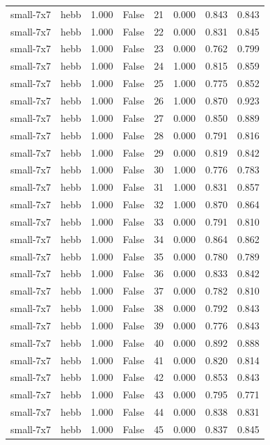 \begin{tabular}{llrrrrrr}
small-7x7 & hebb & 1.000 & False & 21 & 0.000 & 0.843 & 0.843 \\
small-7x7 & hebb & 1.000 & False & 22 & 0.000 & 0.831 & 0.845 \\
small-7x7 & hebb & 1.000 & False & 23 & 0.000 & 0.762 & 0.799 \\
small-7x7 & hebb & 1.000 & False & 24 & 1.000 & 0.815 & 0.859 \\
small-7x7 & hebb & 1.000 & False & 25 & 1.000 & 0.775 & 0.852 \\
small-7x7 & hebb & 1.000 & False & 26 & 1.000 & 0.870 & 0.923 \\
small-7x7 & hebb & 1.000 & False & 27 & 0.000 & 0.850 & 0.889 \\
small-7x7 & hebb & 1.000 & False & 28 & 0.000 & 0.791 & 0.816 \\
small-7x7 & hebb & 1.000 & False & 29 & 0.000 & 0.819 & 0.842 \\
small-7x7 & hebb & 1.000 & False & 30 & 1.000 & 0.776 & 0.783 \\
small-7x7 & hebb & 1.000 & False & 31 & 1.000 & 0.831 & 0.857 \\
small-7x7 & hebb & 1.000 & False & 32 & 1.000 & 0.870 & 0.864 \\
small-7x7 & hebb & 1.000 & False & 33 & 0.000 & 0.791 & 0.810 \\
small-7x7 & hebb & 1.000 & False & 34 & 0.000 & 0.864 & 0.862 \\
small-7x7 & hebb & 1.000 & False & 35 & 0.000 & 0.780 & 0.789 \\
small-7x7 & hebb & 1.000 & False & 36 & 0.000 & 0.833 & 0.842 \\
small-7x7 & hebb & 1.000 & False & 37 & 0.000 & 0.782 & 0.810 \\
small-7x7 & hebb & 1.000 & False & 38 & 0.000 & 0.792 & 0.843 \\
small-7x7 & hebb & 1.000 & False & 39 & 0.000 & 0.776 & 0.843 \\
small-7x7 & hebb & 1.000 & False & 40 & 0.000 & 0.892 & 0.888 \\
small-7x7 & hebb & 1.000 & False & 41 & 0.000 & 0.820 & 0.814 \\
small-7x7 & hebb & 1.000 & False & 42 & 0.000 & 0.853 & 0.843 \\
small-7x7 & hebb & 1.000 & False & 43 & 0.000 & 0.795 & 0.771 \\
small-7x7 & hebb & 1.000 & False & 44 & 0.000 & 0.838 & 0.831 \\
small-7x7 & hebb & 1.000 & False & 45 & 0.000 & 0.837 & 0.845 \\

\end{tabular}
